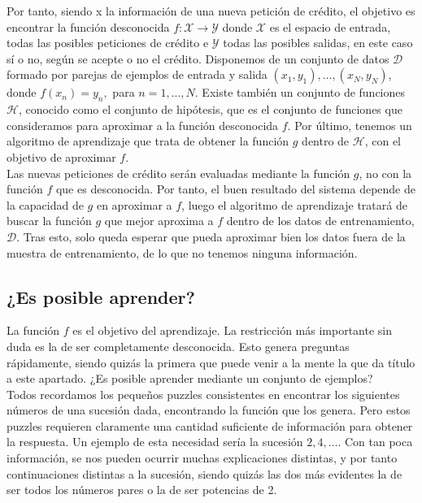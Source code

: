 Por tanto, siendo x la información de una nueva petición de crédito, el objetivo es encontrar la función desconocida $f: \mathcal{X} \rightarrow \mathcal{Y}$ donde $\mathcal{X}$ es el espacio de entrada, todas las posibles peticiones de crédito e $\mathcal{Y}$ todas las posibles salidas, en este caso sí o no, según se acepte o no el crédito. Disponemos de un conjunto de datos $\mathcal{D}$ formado por parejas de ejemplos de entrada y salida $(x_1,y_1),\ldots,(x_N,y_N)$, donde $f(x_n)=y_n, $ para $ n = 1,\ldots,N$. Existe también un conjunto de funciones $\mathcal{H}$, conocido como el conjunto de hipótesis, que es el conjunto de funciones que consideramos para aproximar a la función desconocida $f$. Por último, tenemos un algoritmo de aprendizaje que trata de obtener la función $g$ dentro de $\mathcal{H}$, con el objetivo de aproximar $f$.\\

Las nuevas peticiones de crédito serán evaluadas mediante la función $g$, no con la función $f$ que es desconocida. Por tanto, el buen resultado del sistema depende de la capacidad de $g$ en aproximar a $f$, luego el algoritmo de aprendizaje tratará de buscar la función $g$ que mejor aproxima a $f$ dentro de los datos de entrenamiento, $\mathcal{D}$. Tras esto, solo queda esperar que pueda aproximar bien los datos fuera de la muestra de entrenamiento, de lo que no tenemos ninguna información.\\

\subsection{¿Es posible aprender?}

La función $f$ es el objetivo del aprendizaje. La restricción más importante sin duda es la de ser completamente desconocida. Esto genera preguntas rápidamente, siendo quizás la primera que puede venir a la mente la que da título a este apartado. ¿Es posible aprender mediante un conjunto de ejemplos?\\

Todos recordamos los pequeños puzzles consistentes en encontrar los siguientes números de una sucesión dada, encontrando la función que los genera. Pero estos puzzles requieren claramente una cantidad suficiente de información para obtener la respuesta. Un ejemplo de esta necesidad sería la sucesión ${2,4,\ldots}$. Con tan poca información, se nos pueden ocurrir muchas explicaciones distintas, y por tanto continuaciones distintas a la sucesión, siendo quizás las dos más evidentes la de ser todos los números pares o la de ser potencias de 2.\\

